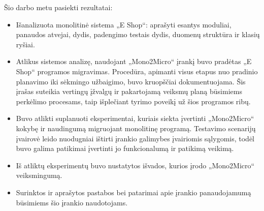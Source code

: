 \documentclass{VUMIFPSbakalaurinis}
\begin{document}
Šio darbo metu pasiekti rezultatai:
\begin{itemize}
    \item Išanalizuota monolitinė sistema „E Shop“: aprašyti esantys moduliai, panaudos atvejai, dydis, padengimo testais dydis, duomenų struktūra ir klasių ryšiai.

    \item Atlikus sistemos analizę, naudojant „Mono2Micro“ įrankį buvo pradėtas „E Shop“ programos migravimas. Procedūra, apimanti visus etapus nuo pradinio planavimo iki sėkmingo užbaigimo, buvo kruopščiai dokumentuojama. Šis įrašas suteikia vertingų įžvalgų ir pakartojamą veiksmų planą būsimiems perkėlimo procesams, taip išplečiant tyrimo poveikį už šios programos ribų.

    \item Buvo atlikti suplanuoti eksperimentai, kuriais siekta įvertinti „Mono2Micro“ kokybę ir naudingumą migruojant monolitinę programą. Testavimo scenarijų įvairovė leido nuodugniai ištirti įrankio galimybes įvairiomis sąlygomis, todėl buvo galima patikimai įvertinti jo funkcionalumą ir patikimą veikimą.

    \item Iš atliktų eksperimentų buvo nustatytos išvados, kurios įrodo „Mono2Micro“ veiksmingumą.

    \item Surinktos ir aprašytos pastabos bei patarimai apie įrankio panaudojamumą būsimiems šio įrankio naudotojams.
    
    
\end{itemize}
\end{document}
